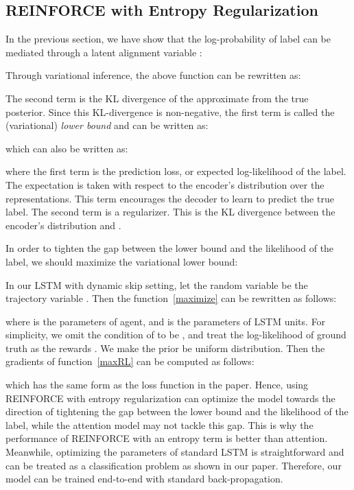 \documentclass[letterpaper]{article} \usepackage{aaai19}  \usepackage{times}  \usepackage{helvet}  \usepackage{courier}  \usepackage{url}  \usepackage{graphicx}  \usepackage{amsmath}
\begin{document}
\subsection{REINFORCE with Entropy Regularization}
In the previous section, we have show that the log-probability of label  can be mediated through a latent alignment variable :

Through variational inference, the above function can be rewritten as:



The second term is the KL divergence of the approximate from the true posterior. Since this KL-divergence is non-negative, the first term is called the (variational) \textit{lower bound}  and can be written as:

which can also be written as:

where the first term is the prediction loss, or expected log-likelihood of the label. The expectation is taken with respect to the encoder’s distribution over the representations. This term encourages the decoder to learn to predict the true label. The second term is a regularizer. This is the KL divergence between the encoder’s distribution  and .

In order to tighten the gap between the lower bound and the likelihood of the label, we should maximize the variational lower bound:


In our LSTM with dynamic skip setting, let the random variable  be the trajectory variable . Then the function~\ref{maximize} can be rewritten as follows:

where  is the parameters of agent, and  is the parameters of LSTM units. For simplicity, we omit the condition of  to be , and treat the log-likelihood of ground truth  as the rewards . We make the prior  be uniform distribution. Then the gradients of function~\ref{maxRL} can be computed as follows:

which has the same form as the loss function in the paper. Hence, using REINFORCE with entropy regularization can optimize the model towards the direction of tightening the gap between the lower bound and the likelihood of the label, while the attention model may not tackle this gap. This is why the performance of REINFORCE with an entropy term is better than attention. Meanwhile, optimizing the parameters of standard LSTM  is straightforward and can be treated as a classification problem as shown in our paper. Therefore, our model can be trained end-to-end with standard back-propagation.



\end{document}
